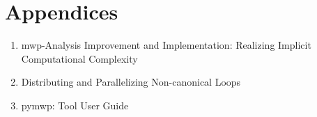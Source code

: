 \section{Appendices}
\label{sec:appendices}


\begin{enumerate}[label=\Alph*]
\item mwp-Analysis Improvement and Implementation: Realizing Implicit Computational Complexity
\item Distributing and Parallelizing Non-canonical Loops
\item pymwp: Tool User Guide
\end{enumerate}




